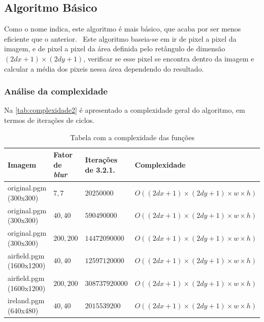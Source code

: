 \subsection{Algoritmo Básico}\label{subsec:blur2}
    \par Como o nome indica, este algoritmo é mais básico, que acaba por ser menos eficiente que o anterior. \ Este algoritmo baseia-se em ir de pixel a pixel da imagem, e de pixel a pixel da área definida pelo retângulo de dimensão $(2dx + 1) \times (2dy + 1)$, verificar se esse pixel se encontra dentro da imagem e calcular a média dos pixeis nessa área dependendo do resultado.

\subsubsection{Análise da complexidade}
    \par Na \autoref{tab:complexidade2} é apresentado a complexidade geral do algoritmo, em termos de iterações de ciclos.

    \begin{table}[H]
        \centering
        \begin{tabular}{| p{23mm} | p{25mm} | p{30mm} | p{38mm} |}
            \hline

            \textbf{Imagem} & \textbf{Fator de \textit{blur}} & \textbf{Iterações de 3.2.1.} & \textbf{Complexidade} \\ \hline

            original.pgm (300x300) & $7,7$ & $20250000$ & $O((2dx + 1) \times (2dy + 1) \times w \times h)$ \\ \hline

            original.pgm (300x300) & $40,40$ & $590490000$ & $O((2dx + 1) \times (2dy + 1) \times w \times h)$ \\ \hline

            original.pgm (300x300) & $200,200$ & $14472090000$ & $O((2dx + 1) \times (2dy + 1) \times w \times h)$ \\ \hline

            airfield.pgm (1600x1200) & $40,40$ & $12597120000$ & $O((2dx + 1) \times (2dy + 1) \times w \times h)$ \\ \hline

            airfield.pgm (1600x1200) & $200,200$ & $308737920000$ & $O((2dx + 1) \times (2dy + 1) \times w \times h)$ \\ \hline

            ireland.pgm (640x480) & $40,40$ & $2015539200$ & $O((2dx + 1) \times (2dy + 1) \times w \times h)$ \\ \hline
        \end{tabular}
        \caption{Tabela com a complexidade das funções}
        \label{tab:complexidade2}
    \end{table}


